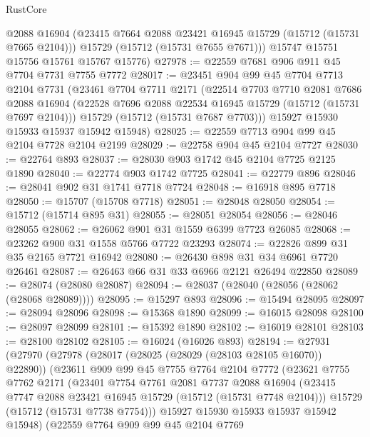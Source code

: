 \begin{lexlean}{RustCore}
\begin{coremodule}
        @2088
        @16904
        (@23415 @7664 @2088 @23421 @16945 @15729 (@15712 (@15731 @7665 @2104)))
        @15729
        (@15712 (@15731 @7655 @7671)))
      @15747
      @15751
      @15756
      @15761
      @15767
      @15776)
@27978 := @22559 @7681 @906 @911 @45 @7704 @7731 @7755 @7772
@28017 := @23451
    @904
    @99
    @45
    @7704
    @7713
    @2104
    @7731
    (@23461
      @7704
      @7711
      @2171
      (@22514
        @7703
        @7710
        @2081
        @7686
        @2088
        @16904
        (@22528 @7696 @2088 @22534 @16945 @15729 (@15712 (@15731 @7697 @2104)))
        @15729
        (@15712 (@15731 @7687 @7703)))
      @15927
      @15930
      @15933
      @15937
      @15942
      @15948)
@28025 := @22559 @7713 @904 @99 @45 @2104 @7728 @2104 @2199
@28029 := @22758 @904 @45 @2104 @7727
@28030 := @22764 @893
@28037 := @28030 @903 @1742 @45 @2104 @7725 @2125 @1890
@28040 := @22774 @903 @1742 @7725
@28041 := @22779 @896
@28046 := @28041 @902 @31 @1741 @7718 @7724
@28048 := @16918 @895 @7718
@28050 := @15707 (@15708 @7718)
@28051 := @28048 @28050
@28054 := @15712 (@15714 @895 @31)
@28055 := @28051 @28054
@28056 := @28046 @28055
@28062 := @26062 @901 @31 @1559 @6399 @7723 @26085
@28068 := @23262 @900 @31 @1558 @5766 @7722 @23293
@28074 := @22826 @899 @31 @35 @2165 @7721 @16942
@28080 := @26430 @898 @31 @34 @6961 @7720 @26461
@28087 := @26463 @66 @31 @33 @6966 @2121 @26494 @22850
@28089 := @28074 (@28080 @28087)
@28094 := @28037 (@28040 (@28056 (@28062 (@28068 @28089))))
@28095 := @15297 @893
@28096 := @15494 @28095
@28097 := @28094 @28096
@28098 := @15368 @1890
@28099 := @16015 @28098
@28100 := @28097 @28099
@28101 := @15392 @1890
@28102 := @16019 @28101
@28103 := @28100 @28102
@28105 := @16024 (@16026 @893)
@28194 := @27931
    (@27970
      (@27978
        (@28017 (@28025 (@28029 (@28103 @28105 @16070)) @22890))
        (@23611
          @909
          @99
          @45
          @7755
          @7764
          @2104
          @7772
          (@23621
            @7755
            @7762
            @2171
            (@23401
              @7754
              @7761
              @2081
              @7737
              @2088
              @16904
              (@23415 @7747 @2088 @23421 @16945 @15729 (@15712 (@15731 @7748 @2104)))
              @15729
              (@15712 (@15731 @7738 @7754)))
            @15927
            @15930
            @15933
            @15937
            @15942
            @15948)
          (@22559
            @7764
            @909
            @99
            @45
            @2104
            @7769

\end{coremodule}
\end{lexlean}
